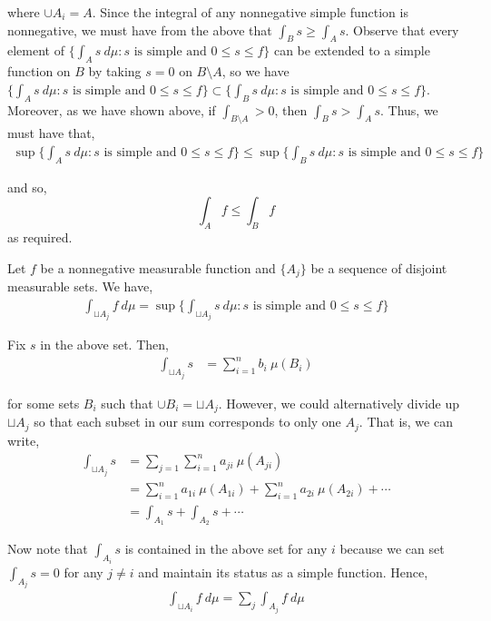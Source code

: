 \documentclass[12pt]{article}
\newenvironment{problem}[2][Problem]{\begin{trivlist}
\item[\hskip \labelsep {\bfseries #1}\hskip \labelsep {\bfseries #2.}]}{\end{trivlist}}
\begin{document}
where $\cup A_i = A$. Since the integral of any nonnegative simple function is nonnegative, we must have from the above that $\int_B s \geq \int_A s$. Observe that every element of $\{ \int_A s \ d\mu: s \text{ is simple and } 0 \leq s \leq f\}$ can be extended to a simple function on $B$ by taking $s = 0$ on $B \setminus A$, so we have $\{ \int_A s \ d\mu: s \text{ is simple and } 0 \leq s \leq f\} \subset \{ \int_B s \ d\mu: s \text{ is simple and } 0 \leq s \leq f\}$. Moreover, as we have shown above, if $\int_{B \setminus A} > 0$, then $\int_B s > \int_A s$. Thus, we must have that,
\begin{align*}
\sup \{ \int_A s \ d\mu: s \text{ is simple and } 0 \leq s \leq f\} \leq \sup \{ \int_B s \ d\mu: s \text{ is simple and } 0 \leq s \leq f\}
\end{align*}

and so, $$\int_A f \leq \int_B f$$ as required.

\begin{problem}{4}
\end{problem}

Let $f$ be a nonnegative measurable function and $\{A_j\}$ be a sequence of disjoint measurable sets. We have,
\begin{align*}
\int_{\sqcup A_j} f \ d\mu = \sup \{ \int_{\sqcup A_j} s \ d\mu: s \text{ is simple and } 0 \leq s \leq f\}
\end{align*}

Fix $s$ in the above set. Then,
\begin{align*}
\int_{\sqcup A_j} s &= \sum_{i=1}^n b_i \ \mu(B_i)
\end{align*}

for some sets $B_i$ such that $\cup B_i = \sqcup A_j$. However, we could alternatively divide up $\sqcup A_j$ so that each subset in our sum corresponds to only one $A_j$. That is, we can write,
\begin{align*}
\int_{\sqcup A_j} s &= \sum_{j=1} \sum_{i=1}^n a_{ji} \ \mu(A_{ji})\\
&= \sum_{i=1}^n a_{1i} \ \mu(A_{1i}) + \sum_{i=1}^n a_{2i} \ \mu(A_{2i}) + \cdots\\
&= \int_{A_1} s + \int_{A_2} s + \cdots
\end{align*}

Now note that $\int_{A_i} s$ is contained in the above set for any $i$ because we can set $\int_{A_j} s = 0$ for any $j \neq i$ and maintain its status as a simple function. Hence,
\begin{align*}
\int_{\sqcup A_i} f \ d\mu = \sum_j \int_{A_j} f \ d\mu
\end{align*}
\end{document}
